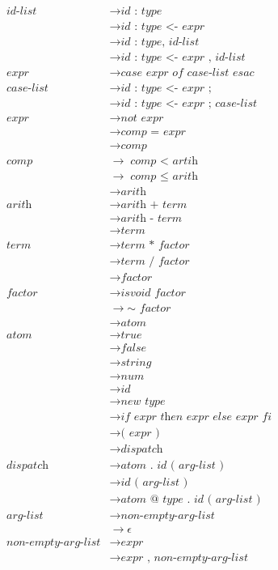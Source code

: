 \documentclass[twoside]{article}
\begin{document}
\begin{align*}
\textit{id-list} &\rightarrow \textit{id : type}\\
&\rightarrow \textit{id : type <- expr}\\
&\rightarrow \textit{id : type, id-list}\\
&\rightarrow \textit{id : type <- expr , id-list}\\
\textit{expr} &\rightarrow \textit{case expr of case-list esac}\\
\textit{case-list} &\rightarrow \textit{id : type <- expr ;}\\
&\rightarrow \textit{id : type <- expr ; case-list}\\
\textit{expr} &\rightarrow \textit{not expr}\\
&\rightarrow \textit{comp = expr}\\
&\rightarrow \textit{comp}\\
\textit{comp} &\rightarrow \textit{comp $<$ artih}\\
&\rightarrow \textit{comp $\leq$ arith}\\
&\rightarrow \textit{arith}\\
\textit{arith} &\rightarrow \textit{arith + term}\\
&\rightarrow \textit{arith - term}\\
&\rightarrow \textit{term}\\
\textit{term} &\rightarrow \textit{term * factor}\\
&\rightarrow \textit{term / factor}\\
&\rightarrow \textit{factor}\\
\textit{factor} &\rightarrow \textit{isvoid factor}\\
&\rightarrow \textit{$\sim$ factor}\\
&\rightarrow \textit{atom}\\
\textit{atom} &\rightarrow \textit{true}\\
&\rightarrow \textit{false}\\
&\rightarrow \textit{string}\\
&\rightarrow \textit{num}\\
&\rightarrow \textit{id}\\
&\rightarrow \textit{new type}\\
&\rightarrow \textit{if expr then expr else expr fi}\\
&\rightarrow \textit{( expr )}\\
&\rightarrow \textit{dispatch}\\
\textit{dispatch} &\rightarrow \textit{atom . id ( arg-list )}\\
&\rightarrow \textit{id ( arg-list )}\\
&\rightarrow \textit{atom @ type . id ( arg-list )}\\
\textit{arg-list} &\rightarrow \textit{non-empty-arg-list}\\
&\rightarrow \epsilon\\
\textit{non-empty-arg-list} &\rightarrow \textit{expr}\\
&\rightarrow \textit{expr , non-empty-arg-list}\\
\end{align*}
\end{document}
